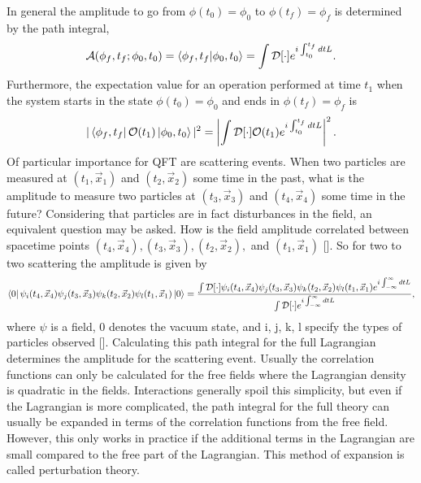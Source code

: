 In general the amplitude to go from $\phi(t_0) = \phi_0$ to $\phi(t_f) = \phi_f$ is determined by the path integral, 
\begin{equation}
\mathcal{A}(\phi_f, t_f; \phi_0, t_0) = \braket{\phi_f,t_f|\phi_0,t_0} = \int \mathcal{D}[\cdot] e^{i\int_{t_0}^{t_f} dt L}.
\end{equation}
Furthermore, the expectation value for an operation performed at time $t_1$ when the system starts in the state $\phi(t_0) = \phi_0$ and ends in $\phi(t_f) = \phi_f$ is
\begin{equation}
|\bra{\phi_f,t_f}\mathcal{O}(t_1)\ket{\phi_0,t_0}|^2 = \left|\int \mathcal{D}[\cdot] \mathcal{O}(t_1) e^{i\int_{t_0}^{t_f} dt L}\right|^2.
\end{equation}
Of particular importance for QFT are scattering events. When two particles are measured at $(t_1,\vec{x}_1)$ and $(t_2,\vec{x}_2)$ some time in the past, what is the amplitude to measure two particles at $(t_3,\vec{x}_3)$ and $(t_4,\vec{x}_4)$ some time in the future? Considering that particles are in fact disturbances in the field, an equivalent question may be asked. How is the field amplitude correlated between spacetime points $(t_4, \vec{x}_4), (t_3, \vec{x}_3), (t_2, \vec{x}_2),$ and $(t_1, \vec{x}_1)$ [\cite{zee}]. So for two to two scattering the amplitude is given by
\begin{equation}
\bra{0}\psi_i(t_4,\vec{x}_4)\psi_j(t_3,\vec{x}_3)\psi_k(t_2,\vec{x}_2)\psi_l(t_1,\vec{x}_1)\ket{0} = 
\frac{\int \mathcal{D}[\cdot]\psi_i(t_4,\vec{x}_4)\psi_j(t_3,\vec{x}_3)\psi_k(t_2,\vec{x}_2)\psi_l(t_1,\vec{x}_1)
e^{i\int_{-\infty}^{\infty} dt L}}{\int \mathcal{D}[\cdot]e^{i\int_{-\infty}^{\infty} dt L}},
\end{equation}
where $\psi$ is a field, 0 denotes the vacuum state, and i, j, k, l specify the types of particles observed [\cite{peskin}]. Calculating this path integral for the full Lagrangian determines the amplitude for the scattering event. Usually the correlation functions can only be calculated for the free fields where the Lagrangian density is quadratic in the fields. Interactions generally spoil this simplicity, but even if the Lagrangian is more complicated, the path integral for the full theory can usually be expanded in terms of the correlation functions from the free field. However, this only works in practice if the additional terms in the Lagrangian are small compared to the free part of the Lagrangian. This method of expansion is called perturbation theory.     

